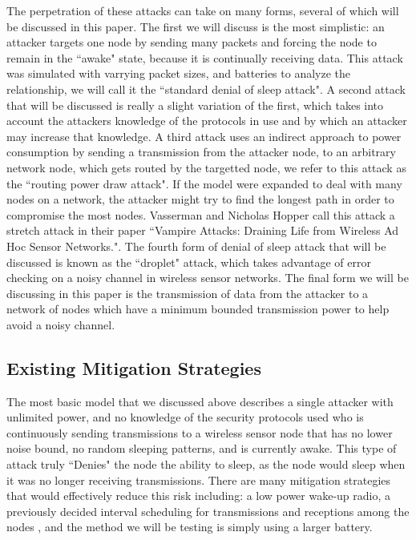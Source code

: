 The perpetration of these attacks can take on many forms, several of which will be discussed in this paper. The first we will discuss is the most simplistic: an attacker targets one node by sending many packets and forcing the
node to remain in the ``awake" state, because it is continually receiving data. This attack was simulated with varrying packet sizes, and batteries to analyze the relationship, we will call it the ``standard denial of sleep attack". A second attack that will be discussed is really a 
slight variation of the first, which takes into account the attackers knowledge of the protocols in use and by which an attacker may increase that knowledge\cite{4476299}. A third attack uses an indirect approach to power 
consumption by sending a transmission from the attacker node, to an arbitrary network node, which gets routed by the targetted node, we refer to this attack as the ``routing power draw attack". If the model were expanded to deal with many nodes on a network, the attacker might try to 
find the longest path in order to compromise the most nodes. Vasserman and Nicholas Hopper call this attack a stretch attack in their paper ``Vampire Attacks: Draining Life from Wireless Ad Hoc Sensor Networks."\cite{6112758}. 
The fourth form of denial of sleep attack that will be discussed is known as the ``droplet" attack, which takes advantage of error checking on a noisy channel in wireless sensor networks\cite{6680296}. The final form we will be 
discussing in this paper is the transmission of data from the attacker to a network of nodes which have a minimum bounded transmission power to help avoid a noisy channel.  

\subsection{Existing Mitigation Strategies}

The most basic model that we discussed above describes a single attacker with unlimited power, and no knowledge of the security protocols used who is continuously sending transmissions to a wireless sensor node that has no lower 
noise bound, no random sleeping patterns, and is currently awake. This type of attack truly ``Denies" the node the ability to sleep, as the node would sleep when it was no longer receiving transmissions. There are many mitigation
strategies that would effectively reduce this risk including: a low power wake-up radio\cite{5211020}, a previously decided interval scheduling for transmissions and receptions among the nodes \cite{4476299}, and the method we will be testing
is simply using a larger battery.

